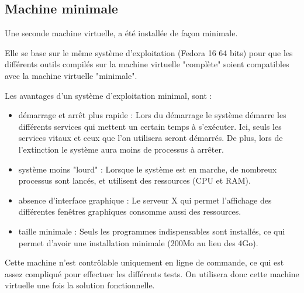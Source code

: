 
\subsection{Machine minimale}

Une seconde machine virtuelle, a été installée de façon minimale.

Elle se base sur le même système d'exploitation (Fedora 16 64 bits) pour que les différents outils compilés sur la machine virtuelle "complète" soient compatibles avec la machine virtuelle "minimale".

Les avantages d'un système d'exploitation minimal, sont :
\begin{itemize}
	\item démarrage et arrêt plus rapide : Lors du démarrage le système démarre les différents services qui mettent un certain temps à s'exécuter. Ici, seuls les services vitaux et ceux que l'on utilisera seront démarrés. De plus, lors de l'extinction le système aura moins de processus à arrêter.
	\item système moins "lourd" : Lorsque le système est en marche, de nombreux processus sont lancés, et utilisent des ressources (CPU et RAM).
	\item absence d'interface graphique : Le serveur X qui permet l'affichage des différentes fenêtres graphiques consomme aussi des ressources.
	\item taille minimale : Seuls les programmes indispensables sont installés, ce qui permet d'avoir une installation minimale (200Mo au lieu des 4Go).
\\
\end{itemize}

Cette machine n'est contrôlable uniquement en ligne de commande, ce qui est assez compliqué pour effectuer les différents tests.
On utilisera donc cette machine virtuelle une fois la solution fonctionnelle.
\\






